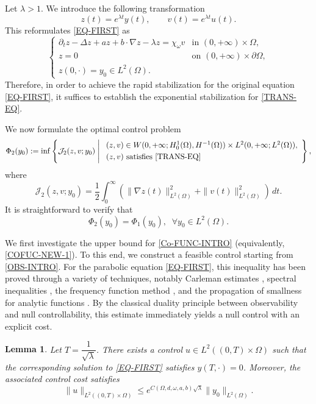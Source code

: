 \documentclass[a4paper]{article}
\newtheorem{lemma}[theorem]{Lemma}
\numberwithin{equation}{section}
\begin{document}
Let $\lambda>1$. We introduce the following transformation
$$z(t)=e^{\lambda t}y(t), \qquad v(t)=e^{\lambda t}u(t).$$
This reformulates \eqref{EQ-FIRST} as
\begin{equation}\label{TRANS-EQ}\begin{cases}
\partial_tz-\Delta z+az+b\cdot \nabla z-\lambda z=\chi_{\omega}v & \text{in } (0,+\infty)\times \Omega,\\[2mm]
z=0& \text{on }(0,+\infty)\times \partial\Omega,\\[2mm]
z( 0,\cdot)=y_0\in L^2(\Omega).
\end{cases}
\end{equation}
Therefore, in order to achieve the rapid stabilization for the original equation \eqref{EQ-FIRST}, it suffices to establish the exponential stabilization for \eqref{TRANS-EQ}.

We now formulate the optimal control problem
\begin{equation}\label{COFUC-NEW-1}
\Phi_2(y_0):= {\inf}\left\{\mathcal J_2(z,v;y_0)\;\middle|\;
\begin{array}{l}
(z,v)\in W(0,+\infty;H_0^1(\Omega),H^{-1}(\Omega))\times L^2(0,+\infty;L^2(\Omega)),\\[1mm]
(z,v)\ \text{satisfies \eqref{TRANS-EQ}}
\end{array}\right\},
\end{equation}
where
\begin{equation}\label{CO-FUNCAL-1}
\mathcal J_2(z,v;y_0)=\frac12\int_0^\infty\left(\|\nabla z(t)\|_{L^2(\Omega)}^2+\|v(t)\|_{L^2(\Omega)}^2\right)\,dt.
\end{equation} 
It is straightforward to verify that
$$\Phi_2(y_0)=\Phi_1(y_0), \;\;\forall y_0\in L^2(\Omega).$$

We first investigate the upper bound for \eqref{Co-FUNC-INTRO} (equivalently, \eqref{COFUC-NEW-1}). To this end, we construct a feasible control starting from \eqref{OBS-INTRO}. For the parabolic equation \eqref{EQ-FIRST}, this inequality has been proved through a variety of techniques, notably Carleman estimates \cite{FZL,FI}, spectral inequalities \cite{LL,LR}, the frequency function method \cite{WK}, and the propagation of smallness for analytic functions \cite{AEWZ,EMZ}. By the classical duality principle between observability and null controllability, this estimate immediately yields a null control with an explicit cost.

\begin{lemma}\label{Lemma-con-cost-sec2}
Let $T=\dfrac{1}{\sqrt{\lambda}}$. There exists a control $u\in L^2((0,T)\times\Omega)$ such that the corresponding solution to \eqref{EQ-FIRST} satisfies $y(T,\cdot)=0$. Moreover, the associated control cost satisfies
\begin{equation}\label{COst-con-523}
\|u\|_{L^2((0,T)\times\Omega)}\le e^{C(\Omega,d,\omega,a,b)\sqrt{\lambda}}\|y_0\|_{L^2(\Omega)}.
\end{equation}
\end{lemma}
\end{document}
